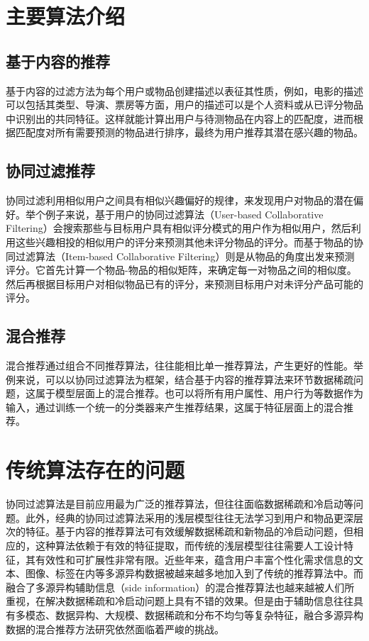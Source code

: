 \section{主要算法介绍}
\subsection{基于内容的推荐}
基于内容的过滤方法为每个用户或物品创建描述以表征其性质，例如，电影的描述可以包括其类型、导演、票房等方面，用户的描述可以是个人资料或从已评分物品中识别出的共同特征。这样就能计算出用户与待测物品在内容上的匹配度，进而根据匹配度对所有需要预测的物品进行排序，最终为用户推荐其潜在感兴趣的物品。
\subsection{协同过滤推荐}
协同过滤利用相似用户之间具有相似兴趣偏好的规律，来发现用户对物品的潜在偏好。举个例子来说，基于用户的协同过滤算法（User-based Collaborative Filtering）会搜索那些与目标用户具有相似评分模式的用户作为相似用户，然后利用这些兴趣相投的相似用户的评分来预测其他未评分物品的评分。而基于物品的协同过滤算法（Item-based Collaborative Filtering）则是从物品的角度出发来预测评分。它首先计算一个物品-物品的相似矩阵，来确定每一对物品之间的相似度。然后再根据目标用户对相似物品已有的评分，来预测目标用户对未评分产品可能的评分。
\subsection{混合推荐}
混合推荐通过组合不同推荐算法，往往能相比单一推荐算法，产生更好的性能。举例来说，可以以协同过滤算法为框架，结合基于内容的推荐算法来环节数据稀疏问题，这属于模型层面上的混合推荐。也可以将所有用户属性、用户行为等数据作为输入，通过训练一个统一的分类器来产生推荐结果，这属于特征层面上的混合推荐。
\section{传统算法存在的问题}
协同过滤算法是目前应用最为广泛的推荐算法，但往往面临数据稀疏和冷启动等问题。此外，经典的协同过滤算法采用的浅层模型往往无法学习到用户和物品更深层次的特征。基于内容的推荐算法可有效缓解数据稀疏和新物品的冷启动问题，但相应的，这种算法依赖于有效的特征提取，而传统的浅层模型往往需要人工设计特征，其有效性和可扩展性非常有限。近些年来，蕴含用户丰富个性化需求信息的文本、图像、标签在内等多源异构数据被越来越多地加入到了传统的推荐算法中。而融合了多源异构辅助信息（side information）的混合推荐算法也越来越被人们所重视，在解决数据稀疏和冷启动问题上具有不错的效果。但是由于辅助信息往往具有多模态、数据异构、大规模、数据稀疏和分布不均匀等复杂特征，融合多源异构数据的混合推荐方法研究依然面临着严峻的挑战\cite{WangWY15CDL}\cite{ZhangYLXM16CKBE}。

